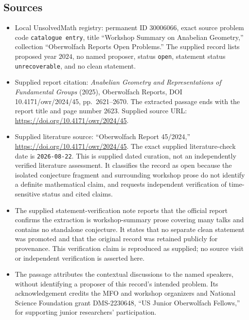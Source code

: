 \documentclass[11pt]{article}
\begin{document}
\subsection{Sources}
\begin{itemize}
\item Local UnsolvedMath registry: permanent ID \(30006066\), exact source problem code \texttt{catalogue entry}, title ``Workshop Summary on Anabelian Geometry,'' collection ``Oberwolfach Reports Open Problems.'' The supplied record lists proposed year \(2024\), no named proposer, status \texttt{open}, statement status \texttt{unrecoverable}, and no clean statement.
\item Supplied report citation: \emph{Anabelian Geometry and Representations of Fundamental Groups} (2025), Oberwolfach Reports, DOI 10.4171/owr/2024/45, pp.\ 2621--2670. The extracted passage ends with the report title and page number 2623. Supplied source URL: \url{https://doi.org/10.4171/owr/2024/45}.
\item Supplied literature source: ``Oberwolfach Report 45/2024,'' \url{https://doi.org/10.4171/owr/2024/45}. The exact supplied literature-check date is \texttt{2026-08-22}. This is supplied dated curation, not an independently verified literature assessment. It classifies the record as open because the isolated conjecture fragment and surrounding workshop prose do not identify a definite mathematical claim, and requests independent verification of time-sensitive status and cited claims.
\item The supplied statement-verification note reports that the official report confirms the extraction is workshop-summary prose covering many talks and contains no standalone conjecture. It states that no separate clean statement was promoted and that the original record was retained publicly for provenance. This verification claim is reproduced as supplied; no source visit or independent verification is asserted here.
\item The passage attributes the contextual discussions to the named speakers, without identifying a proposer of this record's intended problem. Its acknowledgement credits the MFO and workshop organizers and National Science Foundation grant DMS-2230648, ``US Junior Oberwolfach Fellows,'' for supporting junior researchers' participation.
\end{itemize}
\end{document}
